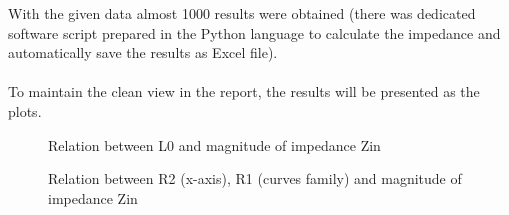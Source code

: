 \documentclass[a4paper, 11pt]{report}
\begin{document}
\noindent
With the given data almost 1000 results were obtained (there was dedicated software script prepared in the Python language to calculate the impedance and automatically save the results as Excel file).
\\
\\
To maintain the clean view in the report, the results will be presented as the plots.
\begin{figure}[!h]
	\centering
	\caption{Relation between L0 and magnitude of impedance Zin}
	\label{fig:figure1}
	\centering
	\vspace{30pt}
	\caption{Relation between R2 (x-axis), R1 (curves family) and magnitude of impedance Zin}
		\vspace{30pt}
	\centering

\end{figure}
\end{document}
